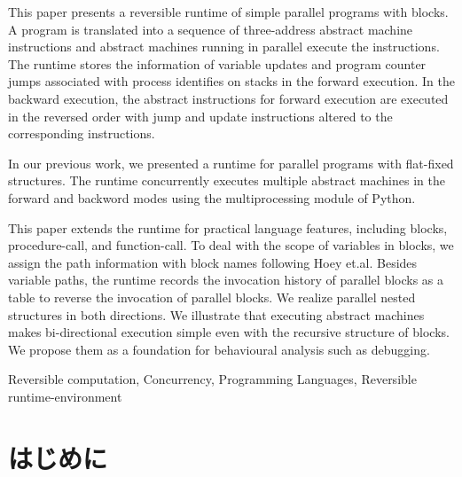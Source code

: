 \documentclass[submit,PRO]{ipsj}
\begin{document}
\begin{eabstract}
This paper presents a reversible runtime of simple parallel programs
with blocks.  A program is translated into a sequence of three-address
abstract machine instructions and abstract machines running in
parallel execute the instructions.  The runtime stores the information
of variable updates and program counter jumps associated with process
identifies on stacks in the forward execution. 
In the backward
execution, the abstract instructions for forward execution are
executed in the reversed order with jump and update instructions altered to
the corresponding instructions.

In our previous work, we presented a runtime for parallel programs with
flat-fixed structures.  The runtime 
concurrently %
executes multiple abstract machines %
in the forward and backword modes %
using the multiprocessing module of Python.

This paper %
extends the runtime for practical language features,
including blocks, procedure-call, and function-call. To deal with the
scope of variables in blocks, we assign the path information with
block names following Hoey et.al.  Besides variable paths, the runtime
records the invocation history of parallel blocks as a table to
reverse the invocation of parallel blocks.  We realize parallel nested
structures in both directions.  We illustrate that executing abstract
machines makes bi-directional execution simple even with the recursive
structure of blocks.  We propose them as a foundation for behavioural
analysis such as debugging.

\end{eabstract}

\begin{ekeyword}
Reversible computation, Concurrency, Programming Languages, Reversible runtime-environment
\end{ekeyword}

\maketitle

\section{はじめに}
\end{document}
